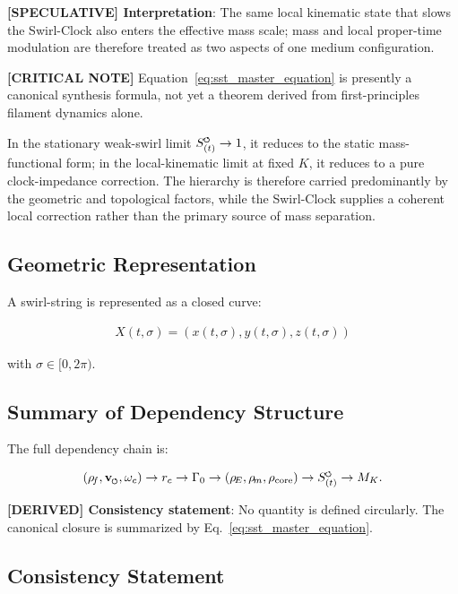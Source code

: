 \documentclass[11pt]{article}
\theoremstyle{definition}
\theoremstyle{plain}
\theoremstyle{remark}
\newcommand{\swirlarrow}{\mathchoice{\mkern-2mu\scriptstyle\boldsymbol{\circlearrowleft}}{\mkern-2mu\scriptstyle\boldsymbol{\circlearrowleft}}{\mkern-2mu\scriptscriptstyle\boldsymbol{\circlearrowleft}}{\mkern-2mu\scriptscriptstyle\boldsymbol{\circlearrowleft}}}
\newcommand{\vswirl}{\mathbf{v}_{\swirlarrow}}
\newcommand{\rhoF}{{\rho_{\!f}}}
\newcommand{\rhoE}{\rho_{\!E}}
\newcommand{\rhoM}{\rho_{\!m}}
\newcommand{\rhocore}{\rho_{\mathrm{core}}}
\newcommand{\SwirlClock}{{S_{(t)}^{\swirlarrow}}}
\newcommand{\rc}{{r_c}}
\begin{document}
        \textbf{[SPECULATIVE] Interpretation}: The same local kinematic state that slows the Swirl-Clock also enters the effective mass scale; mass and local proper-time modulation are therefore treated as two aspects of one medium configuration.

        \textbf{[CRITICAL NOTE]} Equation~\eqref{eq:sst_master_equation} is presently a canonical synthesis formula, not yet a theorem derived from first-principles filament dynamics alone.

        In the stationary weak-swirl limit $\SwirlClock \to 1$, it reduces to the static mass-functional form; in the local-kinematic limit at fixed $K$, it reduces to a pure clock-impedance correction. The hierarchy is therefore carried predominantly by the geometric and topological factors, while the Swirl-Clock supplies a coherent local correction rather than the primary source of mass separation.

    \subsection{Geometric Representation}
        
        A swirl-string is represented as a closed curve:
        
        \begin{align}
            X(t,\sigma) = (x(t,\sigma), y(t,\sigma), z(t,\sigma))
        \end{align}
        
        with $\sigma \in [0,2\pi)$.
    
    \subsection{Summary of Dependency Structure}
        
        The full dependency chain is:
        
        \begin{align}
        (\rhoF, \vswirl, \omega_c)
            \rightarrow \rc
            \rightarrow \Gamma_0
            \rightarrow (\rhoE, \rhoM, \rhocore)
            \rightarrow \SwirlClock
            \rightarrow M_K.
        \end{align}
        
        \textbf{[DERIVED] Consistency statement}:
        No quantity is defined circularly. The canonical closure is summarized by Eq.~\ref{eq:sst_master_equation}.
    
    \subsection{Consistency Statement}
        
\end{document}
